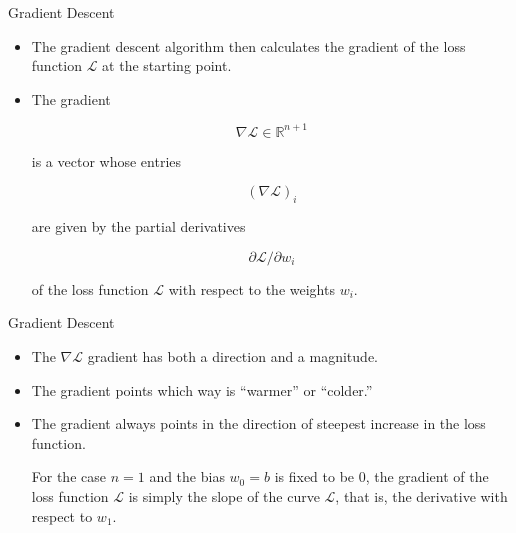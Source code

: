 \documentclass{beamer}
\begin{document}
\begin{frame}{Gradient Descent}
\begin{itemize}
\item The gradient descent algorithm then calculates the gradient of the loss function $\mathcal{L}$ at the starting point. 

\medskip
\item The gradient 

$$\nabla\mathcal{L}\in\mathbb{R}^{n+1}$$ 

is a vector whose entries 

$$(\nabla\mathcal{L})_i$$ 

are given by the partial derivatives 

$$\partial \mathcal{L}/\partial w_i$$ 

of the loss function $\mathcal{L}$ with respect to the weights $w_i$.
\end{itemize}
\end{frame}


\begin{frame}{Gradient Descent}
\begin{itemize}
\medskip    
\item The $\nabla\mathcal{L}$ gradient has both a direction and a magnitude.

\medskip    
\item The gradient points which way is ``warmer'' or ``colder.'' 

\medskip
\item The gradient always points in the direction of steepest increase in the loss function. 

\medskip 
\medskip For the case $n=1$ and the bias $w_0=b$ is fixed to be $0$, the gradient of the loss function $\mathcal{L}$ is simply the slope of the curve $\mathcal{L}$, that is, the derivative with respect to $w_1$.
\end{itemize}
\end{frame}


\end{document}
